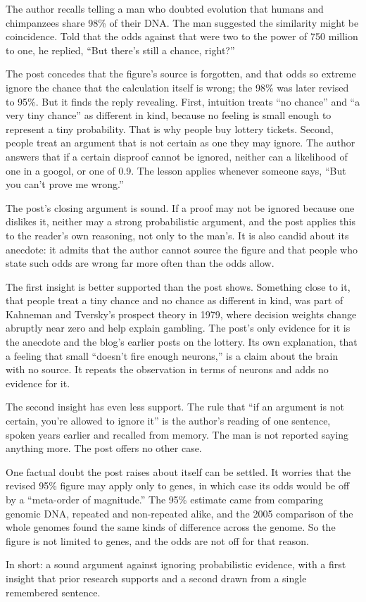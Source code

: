 \begin{afterword}
\summaryhead

The author recalls telling a man who doubted evolution that humans and chimpanzees share 98\% of their DNA. The man suggested the similarity might be coincidence. Told that the odds against that were two to the power of 750 million to one, he replied, ``But there's still a chance, right?''

The post concedes that the figure's source is forgotten, and that odds so extreme ignore the chance that the calculation itself is wrong; the 98\% was later revised to 95\%. But it finds the reply revealing. First, intuition treats ``no chance'' and ``a very tiny chance'' as different in kind, because no feeling is small enough to represent a tiny probability. That is why people buy lottery tickets. Second, people treat an argument that is not certain as one they may ignore. The author answers that if a certain disproof cannot be ignored, neither can a likelihood of one in a googol, or one of 0.9. The lesson applies whenever someone says, ``But you can't prove me wrong.''

\responsehead

The post's closing argument is sound. If a proof may not be ignored because one dislikes it, neither may a strong probabilistic argument, and the post applies this to the reader's own reasoning, not only to the man's. It is also candid about its anecdote: it admits that the author cannot source the figure and that people who state such odds are wrong far more often than the odds allow.

The first insight is better supported than the post shows. Something close to it, that people treat a tiny chance and no chance as different in kind, was part of Kahneman and Tversky's prospect theory in 1979, where decision weights change abruptly near zero and help explain gambling. The post's only evidence for it is the anecdote and the blog's earlier posts on the lottery. Its own explanation, that a feeling that small ``doesn't fire enough neurons,'' is a claim about the brain with no source. It repeats the observation in terms of neurons and adds no evidence for it.

The second insight has even less support. The rule that ``if an argument is not certain, you're allowed to ignore it'' is the author's reading of one sentence, spoken years earlier and recalled from memory. The man is not reported saying anything more. The post offers no other case.

One factual doubt the post raises about itself can be settled. It worries that the revised 95\% figure may apply only to genes, in which case its odds would be off by a ``meta-order of magnitude.'' The 95\% estimate came from comparing genomic DNA, repeated and non-repeated alike, and the 2005 comparison of the whole genomes found the same kinds of difference across the genome. So the figure is not limited to genes, and the odds are not off for that reason.

In short: a sound argument against ignoring probabilistic evidence, with a first insight that prior research supports and a second drawn from a single remembered sentence.
\end{afterword}
